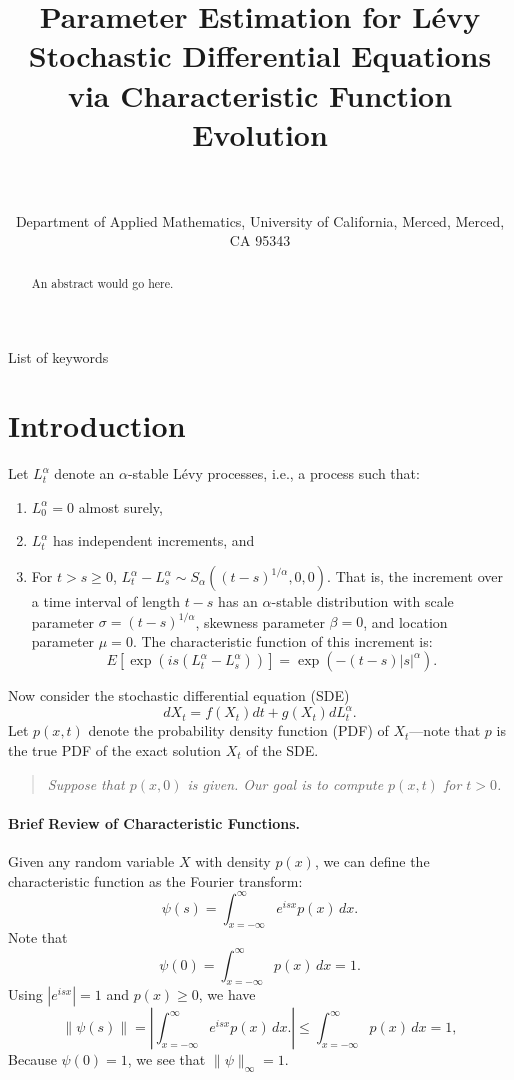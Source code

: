 \documentclass[12pt]{l4dc2021}
\title[Parameter Estimation for L\'{e}vy SDE]{Parameter Estimation for L\'{e}vy Stochastic Differential Equations via Characteristic Function Evolution}
\author{\Name{Harish S. Bhat} \Email{hbhat@ucmerced.edu}\\
 \Name{Arnold D. Kim} \Email{adkim@ucmerced.edu}\\
 \addr Department of Applied Mathematics, University of California, Merced, Merced, CA 95343}
\begin{document}
\maketitle

\begin{abstract}%
 An abstract would go here.%
\end{abstract}

\begin{keywords}%
  List of keywords%
\end{keywords}

\section{Introduction}
Let $L_t^{\alpha}$ denote an $\alpha$-stable L\'{e}vy processes, i.e., a process such that:
\begin{enumerate}
\item $L_0^\alpha = 0$ almost surely,
\item $L_t^\alpha$ has independent increments, and
\item For $t > s \geq 0$, $L_t^\alpha - L_s^\alpha \sim S_\alpha((t-s)^{1/\alpha},0,0)$.  That is, the increment over a time interval of length $t-s$ has an $\alpha$-stable distribution with scale parameter $\sigma = (t-s)^{1/\alpha}$, skewness parameter $\beta=0$, and location parameter $\mu=0$.  The characteristic function of this increment is:
\begin{equation}
\label{eqn:cfinc}
E[\exp(i s (L_t^\alpha - L_s^\alpha))] = \exp(-(t-s) |s|^\alpha).
\end{equation}
\end{enumerate}

\noindent Now consider the stochastic differential equation (SDE)
\begin{equation}
\label{eqn:sde}
dX_t = f(X_t) dt + g(X_t) dL_t^{\alpha}.
\end{equation}
Let $p(x,t)$ denote the probability density function (PDF) of $X_t$---note that $p$ is the true PDF of the exact solution $X_t$ of the SDE.

\begin{quote}
\emph{Suppose that $p(x,0)$ is given.  Our goal is to compute $p(x,t)$ for $t > 0$.}
\end{quote}

\paragraph{Brief Review of Characteristic Functions.} Given any random variable $X$ with density $p(x)$, we can define the characteristic function as the Fourier transform:
\[
\psi(s) = \int_{x=-\infty}^\infty e^{i s x} p(x) \, dx.
\]
Note that
\[
\psi(0) = \int_{x=-\infty}^\infty p(x) \, dx = 1.
\]
Using $|e^{i s x}| = 1$ and $p(x) \geq 0$, we have
\[
\| \psi(s) \| = \left| \int_{x=-\infty}^\infty e^{i s x} p(x) \, dx. \right| \leq \int_{x=-\infty}^\infty p(x) \, dx = 1,
\]
Because $\psi(0) = 1$, we see that $\|\psi \|_\infty = 1$.
\end{document}
